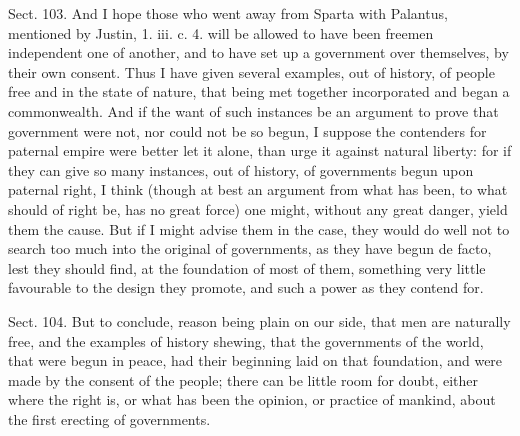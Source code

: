 \documentclass[11pt,openany]{book}
\begin{document}
Sect. 103. And I hope those who went away from Sparta with Palantus, mentioned by Justin, 1. iii. c. 4. will be allowed to have been freemen independent one of another, and to have set up a government over themselves, by their own consent. Thus I have given several examples, out of history, of people free and in the state of nature, that being met together incorporated and began a commonwealth. And if the want of such instances be an argument to prove that government were not, nor could not be so begun, I suppose the contenders for paternal empire were better let it alone, than urge it against natural liberty: for if they can give so many instances, out of history, of governments begun upon paternal right, I think (though at best an argument from what has been, to what should of right be, has no great force) one might, without any great danger, yield them the cause. But if I might advise them in the case, they would do well not to search too much into the original of governments, as they have begun de facto, lest they should find, at the foundation of most of them, something very little favourable to the design they promote, and such a power as they contend for.

Sect. 104. But to conclude, reason being plain on our side, that men are naturally free, and the examples of history shewing, that the governments of the world, that were begun in peace, had their beginning laid on that foundation, and were made by the consent of the people; there can be little room for doubt, either where the right is, or what has been the opinion, or practice of mankind, about the first erecting of governments.
\end{document}
